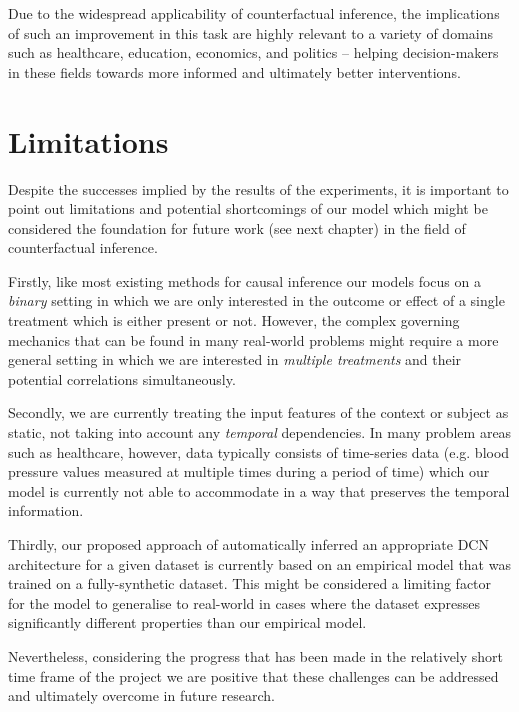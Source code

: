 Due to the widespread applicability of counterfactual inference, the implications of such an  improvement in this task are highly relevant to a variety of domains such as healthcare, education, economics, and politics -- helping decision-makers in these fields towards more informed and ultimately better interventions. 

\section{Limitations}
Despite the successes implied by the results of the experiments, it is important to point out limitations and potential shortcomings of our model which might be considered the foundation for future work (see next chapter) in the field of counterfactual inference. 

Firstly, like most existing methods for causal inference our models focus on a \emph{binary} setting in which we are only interested in the outcome or effect of a single treatment which is either present or not. However, the complex governing mechanics that can be found in many real-world problems might require a more general setting in which we are interested in \emph{multiple treatments} and their potential correlations simultaneously.

Secondly, we are currently treating the input features of the context or subject as static, not taking into account any \emph{temporal} dependencies. In many problem areas such as healthcare, however, data typically consists of time-series data (e.g. blood pressure values measured at multiple times during a period of time) which our model is currently not able to accommodate in a way that preserves the temporal information. 

Thirdly, our proposed approach of automatically inferred an appropriate DCN architecture for a given dataset is currently based on an empirical model that was trained on a fully-synthetic dataset. This might be considered a limiting factor for the model to generalise to real-world in cases where the dataset expresses significantly different properties than our empirical model.  

Nevertheless, considering the progress that has been made in the relatively short time frame of the project we are positive that these challenges can be addressed and ultimately overcome in future research.


%


